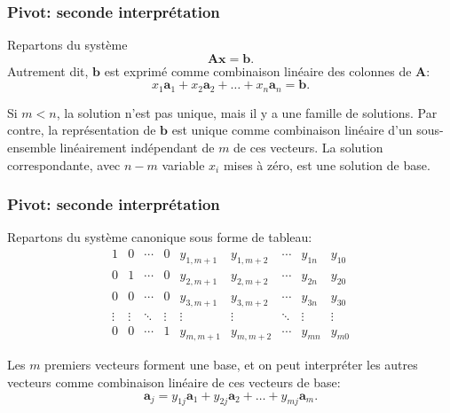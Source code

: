 \documentclass[t,usepdftitle=false]{beamer}
\def\ba{\boldsymbol{a}}
\def\bb{\boldsymbol{b}}
\def\bx{\boldsymbol{x}}
\def\bA{\boldsymbol{A}}
\begin{document}
\begin{frame}
\frametitle{Pivot: seconde interprétation}

Repartons du système
\[
\bA \bx = \bb.
\]
Autrement dit, $\bb$ est exprimé comme combinaison linéaire des colonnes de $\bA$:
\[
x_1 \ba_1 + x_2 \ba_2 + \ldots + x_n \ba_n = \bb.
\]

\mbox{}

Si $m < n$, la solution n'est pas unique, mais il y a une famille de solutions. Par contre, la représentation de $\bb$ est unique comme combinaison linéaire d'un sous-ensemble linéairement indépendant de $m$ de ces vecteurs. La solution correspondante, avec $n-m$ variable $x_i$ mises à zéro, est une solution de base.

\end{frame}

\begin{frame}
\frametitle{Pivot: seconde interprétation}

Repartons du système canonique sous forme de tableau:
\[
\begin{matrix}
1 & 0 & \cdots & 0 & y_{1,m+1} & y_{1,m+2} & \cdots & y_{1n} & y_{10} \\
0 & 1 & \cdots & 0 & y_{2,m+1} & y_{2,m+2} & \cdots & y_{2n} & y_{20} \\
0 & 0 & \cdots & 0 & y_{3,m+1} & y_{3,m+2} & \cdots & y_{3n} & y_{30} \\
\vdots & \vdots & \ddots & \vdots & \vdots & \vdots & \ddots & \vdots & \vdots \\
0 & 0 & \cdots & 1 & y_{m,m+1} & y_{m,m+2} & \cdots & y_{mn} & y_{m0}
\end{matrix}
\]

\mbox{}

Les $m$ premiers vecteurs forment une base, et on peut interpréter les autres vecteurs comme combinaison linéaire de ces vecteurs de base:
\[
\ba_j = y_{1j} \ba_1 + y_{2j} \ba_2 + \ldots + y_{mj} \ba_m.
\]

\end{frame}
\end{document}
